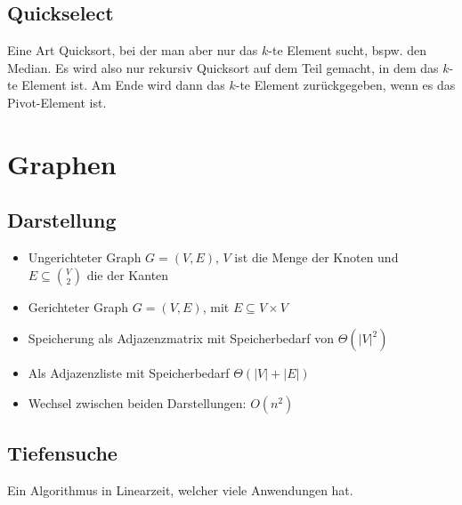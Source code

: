 \documentclass[11pt]{scrartcl}
\begin{document}
\subsection{Quickselect}

Eine Art Quicksort, bei der man aber nur das $k$-te Element sucht, bspw. den Median.
Es wird also nur rekursiv Quicksort auf dem Teil gemacht, in dem das $k$-te Element ist. Am Ende wird dann das $k$-te Element zurückgegeben, wenn es das Pivot-Element ist.

\section{Graphen}

\subsection{Darstellung}
\begin{itemize}
	\item Ungerichteter Graph $G=(V,E)$, $V$ ist die Menge der Knoten und $E \subseteq \binom V 2$ die der Kanten
    \item Gerichteter Graph $G=(V,E)$, mit $E \subseteq V \times V$
    \item Speicherung als Adjazenzmatrix mit Speicherbedarf von $\Theta (|V|^2)$
    \item Als Adjazenzliste mit Speicherbedarf $\Theta (|V|+|E|)$
    \item Wechsel zwischen beiden Darstellungen: $O(n^2)$
\end{itemize}

\subsection{Tiefensuche}

Ein Algorithmus in Linearzeit, welcher viele Anwendungen hat.
\end{document}

